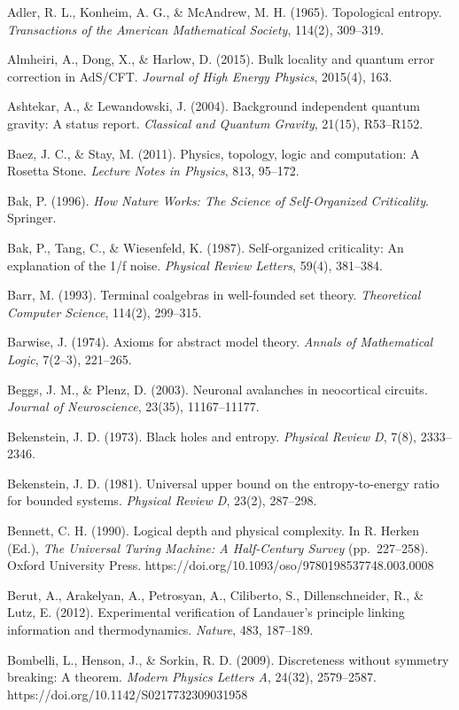 \documentclass[
]{article}
\begin{document}
Adler, R. L., Konheim, A. G., \& McAndrew, M. H. (1965). Topological
entropy. \emph{Transactions of the American Mathematical Society},
114(2), 309--319.

Almheiri, A., Dong, X., \& Harlow, D. (2015). Bulk locality and quantum
error correction in AdS/CFT. \emph{Journal of High Energy Physics},
2015(4), 163.

Ashtekar, A., \& Lewandowski, J. (2004). Background independent quantum
gravity: A status report. \emph{Classical and Quantum Gravity}, 21(15),
R53--R152.

Baez, J. C., \& Stay, M. (2011). Physics, topology, logic and
computation: A Rosetta Stone. \emph{Lecture Notes in Physics}, 813,
95--172.

Bak, P. (1996). \emph{How Nature Works: The Science of Self-Organized
Criticality}. Springer.

Bak, P., Tang, C., \& Wiesenfeld, K. (1987). Self-organized criticality:
An explanation of the 1/f noise. \emph{Physical Review Letters}, 59(4),
381--384.

Barr, M. (1993). Terminal coalgebras in well-founded set theory.
\emph{Theoretical Computer Science}, 114(2), 299--315.

Barwise, J. (1974). Axioms for abstract model theory. \emph{Annals of
Mathematical Logic}, 7(2--3), 221--265.

Beggs, J. M., \& Plenz, D. (2003). Neuronal avalanches in neocortical
circuits. \emph{Journal of Neuroscience}, 23(35), 11167--11177.

Bekenstein, J. D. (1973). Black holes and entropy. \emph{Physical Review
D}, 7(8), 2333--2346.

Bekenstein, J. D. (1981). Universal upper bound on the entropy-to-energy
ratio for bounded systems. \emph{Physical Review D}, 23(2), 287--298.

Bennett, C. H. (1990). Logical depth and physical complexity. In R.
Herken (Ed.), \emph{The Universal Turing Machine: A Half-Century Survey}
(pp.~227--258). Oxford University Press.
https://doi.org/10.1093/oso/9780198537748.003.0008

Berut, A., Arakelyan, A., Petrosyan, A., Ciliberto, S., Dillenschneider,
R., \& Lutz, E. (2012). Experimental verification of Landauer's
principle linking information and thermodynamics. \emph{Nature}, 483,
187--189.

Bombelli, L., Henson, J., \& Sorkin, R. D. (2009). Discreteness without
symmetry breaking: A theorem. \emph{Modern Physics Letters A}, 24(32),
2579--2587. https://doi.org/10.1142/S0217732309031958
\end{document}
